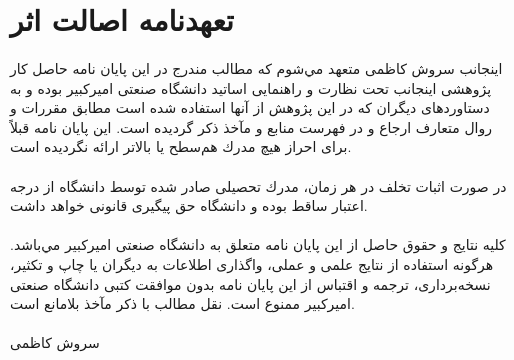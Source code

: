 
\thispagestyle{empty}

\section*{تعهدنامه اصالت اثر}

\paragraph*{}
اینجانب سروش کاظمی متعهد مي‌شوم كه مطالب مندرج در این پایان نامه حاصل كار پژوهشی اینجانب تحت نظارت و راهنمایی اساتید دانشگاه صنعتی امیركبیر بوده و به دستاوردهای دیگران كه در این پژوهش از آنها استفاده شده است مطابق مقررات و روال متعارف ارجاع و در فهرست منابع و مآخذ ذكر گردیده است. این پایان نامه قبلاً برای احراز هیچ مدرك هم‌سطح یا بالاتر ارائه نگردیده است.

\paragraph*{}
در صورت اثبات تخلف در هر زمان، مدرك تحصیلی صادر شده توسط دانشگاه از درجه اعتبار ساقط بوده و دانشگاه حق پیگیری قانونی خواهد داشت.

\paragraph*{}
كلیه نتایج و حقوق حاصل از این پایان نامه متعلق به دانشگاه صنعتی امیركبیر مي‌باشد. هرگونه استفاده از نتایج علمی و عملی، واگذاری اطلاعات به دیگران یا چاپ و تكثیر، نسخه‌برداری، ترجمه و اقتباس از این پایان نامه بدون موافقت كتبی دانشگاه صنعتی امیركبیر ممنوع است. نقل مطالب با ذكر مآخذ بلامانع است.

\paragraph*{} \paragraph*{} \paragraph*{}

\begin{center}
سروش کاظمی
\end{center}
